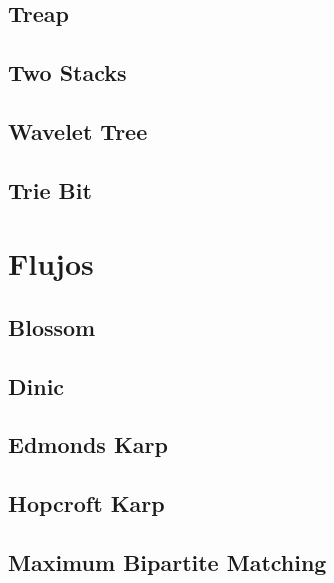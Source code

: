 \subsection{Treap}
\raggedbottom
\hrulefill
\subsection{Two Stacks}
\raggedbottom
\hrulefill
\subsection{Wavelet Tree}
\raggedbottom
\hrulefill
\subsection{Trie Bit}
\raggedbottom
\hrulefill

\section{Flujos}
\subsection{Blossom}
\raggedbottom
\hrulefill
\subsection{Dinic}
\raggedbottom
\hrulefill
\subsection{Edmonds Karp}
\raggedbottom
\hrulefill
\subsection{Hopcroft Karp}
\raggedbottom
\hrulefill
\subsection{Maximum Bipartite Matching}
\raggedbottom
\hrulefill

